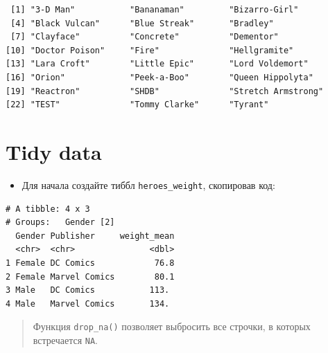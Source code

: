 \documentclass[
]{book}
\newenvironment{Shaded}{\begin{snugshade}}{\end{snugshade}}
\newcommand{\DataTypeTok}[1]{\textcolor[rgb]{0.13,0.29,0.53}{#1}}
\newcommand{\KeywordTok}[1]{\textcolor[rgb]{0.13,0.29,0.53}{\textbf{#1}}}
\newcommand{\NormalTok}[1]{#1}
\newcommand{\OperatorTok}[1]{\textcolor[rgb]{0.81,0.36,0.00}{\textbf{#1}}}
\newcommand{\OtherTok}[1]{\textcolor[rgb]{0.56,0.35,0.01}{#1}}
\newcommand{\StringTok}[1]{\textcolor[rgb]{0.31,0.60,0.02}{#1}}
\providecommand{\tightlist}{%
  \setlength{\itemsep}{0pt}\setlength{\parskip}{0pt}}
\begin{document}
\begin{verbatim}
 [1] "3-D Man"           "Bananaman"         "Bizarro-Girl"     
 [4] "Black Vulcan"      "Blue Streak"       "Bradley"          
 [7] "Clayface"          "Concrete"          "Dementor"         
[10] "Doctor Poison"     "Fire"              "Hellgramite"      
[13] "Lara Croft"        "Little Epic"       "Lord Voldemort"   
[16] "Orion"             "Peek-a-Boo"        "Queen Hippolyta"  
[19] "Reactron"          "SHDB"              "Stretch Armstrong"
[22] "TEST"              "Tommy Clarke"      "Tyrant"           
\end{verbatim}

\hypertarget{solution_join}{%
\section{Tidy data}\label{solution_join}}

\begin{itemize}
\tightlist
\item
  Для начала создайте тиббл \texttt{heroes\_weight}, скопировав код:
\end{itemize}

\begin{Shaded}
\end{Shaded}

\begin{verbatim}
# A tibble: 4 x 3
# Groups:   Gender [2]
  Gender Publisher     weight_mean
  <chr>  <chr>               <dbl>
1 Female DC Comics            76.8
2 Female Marvel Comics        80.1
3 Male   DC Comics           113. 
4 Male   Marvel Comics       134. 
\end{verbatim}

\begin{quote}
Функция \texttt{drop\_na()} позволяет выбросить все строчки, в которых встречается \texttt{NA}.
\end{quote}
\end{document}
